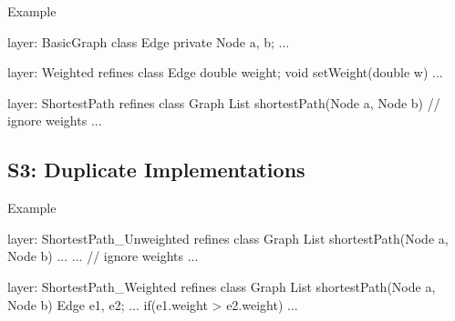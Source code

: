 \begin{frame}[fragile]{Example}
	\begin{mycolumns}[widths={50,50},animation=none]
		\vspace{3mm}
	\mynextcolumn
{\small
\begin{codetight}{layer: BasicGraph}
class Edge {
	private Node a, b;
	...
}
\end{codetight}	
\begin{codetight}{layer: Weighted}
refines class Edge {
	double weight;
	void setWeight(double w){ ... }
}
\end{codetight}	
\begin{codetight}{layer: ShortestPath}
refines class Graph {
	List shortestPath(Node a, Node b){
		// ignore weights
		... 
	}
}
\end{codetight}	
}
	\end{mycolumns}
\end{frame}

\subsection{S3: Duplicate Implementations}

\begin{frame}{\myframetitle}
\end{frame}

\begin{frame}[fragile]{Example}
	\begin{mycolumns}[widths={50,50},animation=none]
\begin{codetight}{layer: ShortestPath\_Unweighted}
refines class Graph {
	List shortestPath(Node a, Node b){
		...
		...
		// ignore weights
		... 
	}
}
\end{codetight}
	\mynextcolumn
\begin{codetight}{layer: ShortestPath\_Weighted}
refines class Graph {
	List shortestPath(Node a, Node b){
		Edge e1, e2;
		...
		if(e1.weight > e2.weight) 
		... 
	}
}
\end{codetight}	
	\end{mycolumns}
\end{frame}

